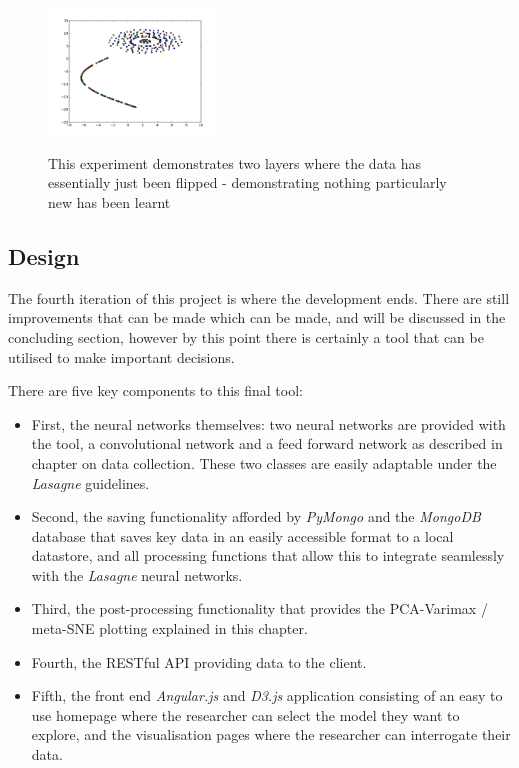 \documentclass[a4paper,11pt,titlepage]{article}
\begin{document}
		\begin{figure}[H]
    			\qquad
    			{{\includegraphics[width=0.4\textwidth]
    				{img/sne_plot_E2_L3_rotation.png} 
    			}}%
    			\caption{This experiment demonstrates two layers where the data has essentially just been flipped - demonstrating nothing particularly new has been learnt}%
		\end{figure}

	\subsection{Design}
	The fourth iteration of this project is where the development ends. There are still improvements that can be made which can be made, and will be discussed in the concluding section, however by this point there is certainly a tool that can be utilised to make important decisions. 
	\par 
	There are five key components to this final tool:
	\begin{itemize}
		\item First, the neural networks themselves: two neural networks are provided with the tool, a convolutional network and a feed forward network as described in chapter on data collection. These two classes are easily adaptable under the \textit{Lasagne} guidelines.
		\item Second, the saving functionality afforded by \textit{PyMongo} and the \textit{MongoDB} database that saves key data in an easily accessible format to a local datastore, and all processing functions that allow this to integrate seamlessly with the \textit{Lasagne} neural networks.
		\item Third, the post-processing functionality that provides the PCA-Varimax / meta-SNE plotting explained in this chapter. 
		\item Fourth, the RESTful API providing data to the client.
		\item Fifth, the front end \textit{Angular.js} and \textit{D3.js} application consisting of an easy to use homepage where the researcher can select the model they want to explore, and the visualisation pages where the researcher can interrogate their data.
	\end{itemize}
	
\end{document}
